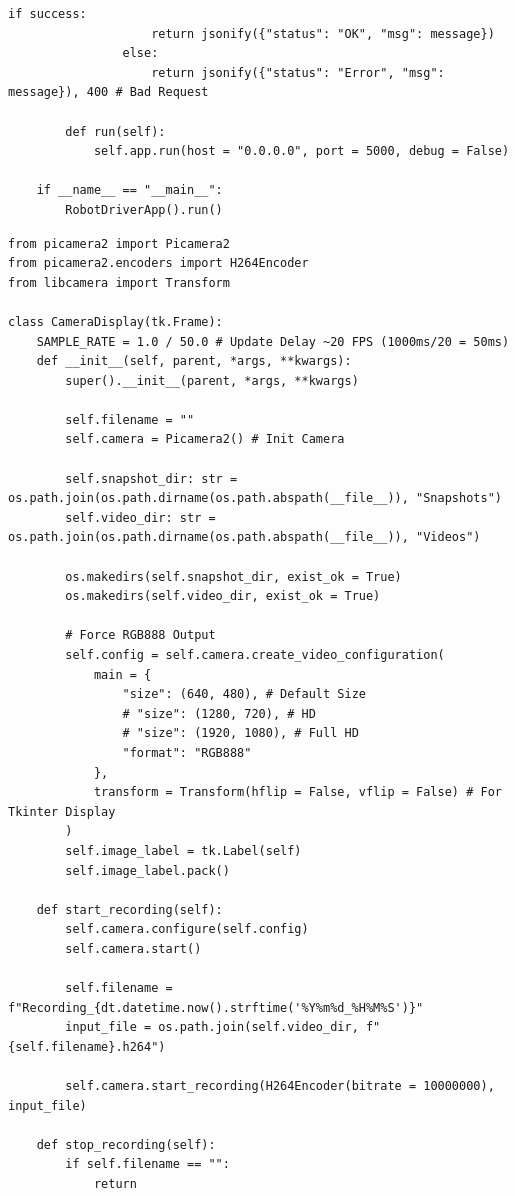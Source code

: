 \documentclass{article}
\begin{document}
\begin{lstlisting}[caption={Source Code : Robot Driver App}, label={lst:driver_app_code}]
                if success:
                    return jsonify({"status": "OK", "msg": message})
                else:
                    return jsonify({"status": "Error", "msg": message}), 400 # Bad Request

        def run(self):
            self.app.run(host = "0.0.0.0", port = 5000, debug = False)

    if __name__ == "__main__":
        RobotDriverApp().run()
\end{lstlisting}


\begin{lstlisting}[caption={Source Code : PiCamera Display}, label={lst:picamera_display_code}]
from picamera2 import Picamera2
from picamera2.encoders import H264Encoder
from libcamera import Transform

class CameraDisplay(tk.Frame):
    SAMPLE_RATE = 1.0 / 50.0 # Update Delay ~20 FPS (1000ms/20 = 50ms)
    def __init__(self, parent, *args, **kwargs):
        super().__init__(parent, *args, **kwargs)

        self.filename = ""
        self.camera = Picamera2() # Init Camera

        self.snapshot_dir: str = os.path.join(os.path.dirname(os.path.abspath(__file__)), "Snapshots")
        self.video_dir: str = os.path.join(os.path.dirname(os.path.abspath(__file__)), "Videos")

        os.makedirs(self.snapshot_dir, exist_ok = True)
        os.makedirs(self.video_dir, exist_ok = True)

        # Force RGB888 Output
        self.config = self.camera.create_video_configuration(
            main = {
                "size": (640, 480), # Default Size
                # "size": (1280, 720), # HD
                # "size": (1920, 1080), # Full HD
                "format": "RGB888"
            },
            transform = Transform(hflip = False, vflip = False) # For Tkinter Display
        )
        self.image_label = tk.Label(self)
        self.image_label.pack()

    def start_recording(self):
        self.camera.configure(self.config)
        self.camera.start()

        self.filename = f"Recording_{dt.datetime.now().strftime('%Y%m%d_%H%M%S')}"
        input_file = os.path.join(self.video_dir, f"{self.filename}.h264")

        self.camera.start_recording(H264Encoder(bitrate = 10000000), input_file)

    def stop_recording(self):
        if self.filename == "":
            return


\end{lstlisting}
\end{document}
